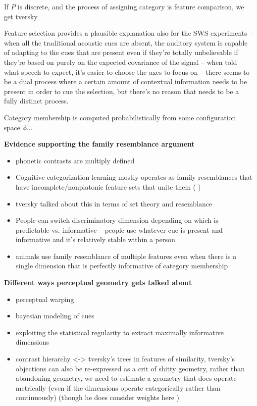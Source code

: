 \begin{multicols}{2}
If $P$ is discrete, and the process of assigning category is feature comparison, we get tversky


Feature selection provides a plausible explanation also for the SWS experiments -- when all the traditional acoustic cues are absent, the auditory system is capable of adapting to the cues that are present even if they're totally unbelievable if they're based on purely on the expected covariance of the signal\cite{remezSpeechPerceptionTraditional1981} -- when told what speech to expect, it's easier to choose the axes to focus on -- there seems to be a dual process where a certain amount of contextual information needs to be present in order to cue the selection, but there's no reason that needs to be a fully distinct process.

Category membership is computed probabilistically from some configuration space $\phi$...



\textbf{Evidence supporting the family resemblance argument}
\begin{itemize}
	\item phonetic contrasts are multiply defined\cite{Lisker1977,Bailey1980}
	\item Cognitive categorization learning mostly operates as family resemblances that have incomplete/nonplatonic feature sets that unite them (\cite{roschFamilyResemblancesStudies1975}\cite{roschWittgensteinCategorizationResearch1987} \cite{couchmanRulesResemblanceTheir2010})
	\item tversky talked about this in terms of set theory and resemblance \cite{tverskyStudiesSimilarity1978} \cite{Tversky1970}
	\item People can switch discriminatory dimension depending on which is predictable vs. informative -- people use whatever cue is present and informative \cite{kiefteAbsorptionReliableSpectral2008} and it's relatively stable within a person \cite{souzaReliabilityRepeatabilitySpeech2018}
	\item animals use family resemblance of multiple features even when there is a single dimension that is perfectly informative of category membership \cite{leaUseMultipleDimensions2008, couchmanRulesResemblanceTheir2010}

\end{itemize}

\textbf{Different ways perceptual geometry gets talked about}
\begin{itemize}
	\item perceptual warping
	\item bayesian modeling of cues
	\item exploiting the statistical regularity to extract maximally informative dimensions
	\item contrast hierarchy <-> tversky's trees in features of similarity, tversky's objections can also be re-expressed as a crit of shitty geometry, rather than abandoning geometry, we need to estimate a geometry that does operate metrically (even if the dimensions operate categorically rather than continuously) (though he does consider weights here \cite{ritovDifferentialWeightingCommon1990})
\end{itemize}


\end{multicols}
